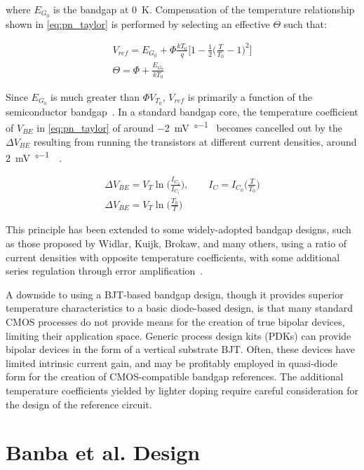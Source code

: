 \documentclass[journal]{IEEEtran}
\begin{document}
\noindent where \(E_{G_0}\) is the bandgap at \qty{0}{\K}. Compensation of the temperature relationship shown in \cref{eq:pn_taylor} is performed by selecting an effective \(\Theta\) such that:

\begin{gather}
    V_{ref} = E_{G_0} + \Phi\frac{kT_0}{q}\biggl[1 - \frac{1}{2}\biggl(\frac{T}{T_0} - 1\biggr)^2\biggr] \label{eq:bg_vout}\\
    \Theta = \Phi + \frac{E_{G_0}}{kT_0} \label{eq:hilbiber}
\end{gather}

\noindent Since \(E_{G_0}\) is much greater than \(\Phi V_{T_0}\), \(V_{ref}\) is primarily a function of the semiconductor bandgap~\cite{Hibiber1964}. In a standard bandgap core, the temperature coefficient of \(V_{BE}\) in \cref{eq:pn_taylor} of around \qty{-2}{\mV\per\degree\C} becomes cancelled out by the \(\Delta V_{BE}\) resulting from running the transistors at different current densities, around \qty{+2}{\mV\per\degree\C}~\cite{Widlar1967,Pease1990}. 

\begin{gather}
    \Delta V_{BE} = V_T \ln{\Biggl(\frac{I_{C_2}}{I_{C_1}}\Biggr)}, \qquad I_C = I_{C_0}\biggl(\frac{T}{T_0}\biggr) \nonumber \\
    \Delta V_{BE} = V_T \ln{\biggl(\frac{T_0}{T}\biggr)} \label{eq:d_vbe}
\end{gather}

This principle has been extended to some widely-adopted bandgap designs, such as those proposed by Widlar, Kuijk, Brokaw, and many others, using a ratio of current densities with opposite temperature coefficients, with some additional series regulation through error amplification~\cite{Widlar1971,Kuijk1973,Brokaw1974}.

A downside to using a BJT-based bandgap design, though it provides superior temperature characteristics to a basic diode-based design, is that many standard CMOS processes do not provide means for the creation of true bipolar devices, limiting their application space. Generic process design kits (PDKs) can provide bipolar devices in the form of a vertical substrate BJT. Often, these devices have limited intrinsic current gain, and may be profitably employed in quasi-diode form for the creation of CMOS-compatible bandgap references. The additional temperature coefficients yielded by lighter doping require careful consideration for the design of the reference circuit.

\section{Banba et al. Design}
\end{document}
